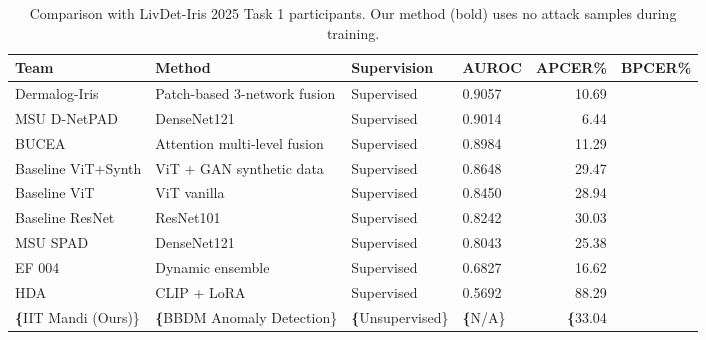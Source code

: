 \begin{table}[htbp]
  \centering
  \caption{Comparison with LivDet-Iris 2025 Task 1 participants. Our method (bold) uses no attack samples during training.}
  \label{tab:livdet2025}
  \begin{tabular}{llllrr}
    \toprule
    Team & Method & Supervision & AUROC & APCER\% & BPCER\% \\
    \midrule
    Dermalog-Iris & Patch-based 3-network fusion & Supervised & 0.9057 & 10.69\\%
    MSU D-NetPAD & DenseNet121 & Supervised & 0.9014 & 6.44\\%
    BUCEA & Attention multi-level fusion & Supervised & 0.8984 & 11.29\\%
    Baseline ViT+Synth & ViT + GAN synthetic data & Supervised & 0.8648 & 29.47\\%
    Baseline ViT & ViT vanilla & Supervised & 0.8450 & 28.94\\%
    Baseline ResNet & ResNet101 & Supervised & 0.8242 & 30.03\\%
    MSU SPAD & DenseNet121 & Supervised & 0.8043 & 25.38\\%
    EF 004 & Dynamic ensemble & Supervised & 0.6827 & 16.62\\%
    HDA & CLIP + LoRA & Supervised & 0.5692 & 88.29\\%
    \textbf\{IIT Mandi (Ours)\} & \textbf\{BBDM Anomaly Detection\} & \textbf\{Unsupervised\} & \textbf\{N/A\} & \textbf\{33.04\\%
    \bottomrule
  \end{tabular}
\end{table}